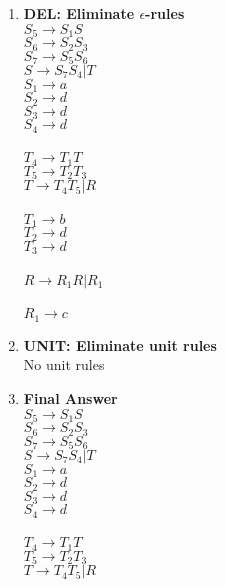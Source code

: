 \documentclass{article}
\begin{document}
\begin{enumerate}
\begin{enumerate}
			\item \textbf{DEL: Eliminate $\epsilon$-rules}\\
				$S_5 \rightarrow S_1S$\\
				$S_6 \rightarrow S_2S_3$\\
				$S_7 \rightarrow S_5S_6$\\
				$S \rightarrow S_7S_4 | T$\\

				$S_1 \rightarrow a$\\
				$S_2 \rightarrow d$\\$S_3 \rightarrow d$\\$S_4 \rightarrow d$\\\\

				$T_4 \rightarrow T_1T$\\
				$T_5 \rightarrow T_2T_3$\\
				$T \rightarrow T_4T_5 | R$\\\\

				$T_1 \rightarrow b$\\ $T_2 \rightarrow d$\\$T_3 \rightarrow d$\\\\

				$R \rightarrow R_1R | R_1$\\\\
				$R_1 \rightarrow c$\\
			\item \textbf{UNIT: Eliminate unit rules}\\
				No unit rules
			\item \textbf{Final Answer}\\
				$S_5 \rightarrow S_1S$\\
				$S_6 \rightarrow S_2S_3$\\
				$S_7 \rightarrow S_5S_6$\\
				$S \rightarrow S_7S_4 | T$\\

				$S_1 \rightarrow a$\\
				$S_2 \rightarrow d$\\$S_3 \rightarrow d$\\$S_4 \rightarrow d$\\\\

				$T_4 \rightarrow T_1T$\\
				$T_5 \rightarrow T_2T_3$\\
				$T \rightarrow T_4T_5 | R$\\\\


\end{enumerate}
\end{enumerate}
\end{document}
